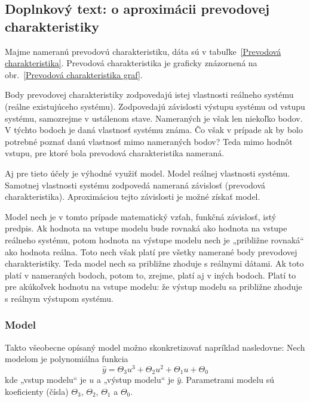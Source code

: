 \documentclass[a4paper, 10pt, ]{article}
\begin{document}

\subsection{Doplnkový text: o aproximácii prevodovej charakteristiky}

Majme nameranú prevodovú charakteristiku, dáta sú v tabuľke~\ref{Prevodová charakteristika}. Prevodová charakteristika je graficky znázornená na obr.~\ref{Prevodová charakteristika graf}.

Body prevodovej charakteristiky zodpovedajú istej vlastnosti reálneho systému (reálne existujúceho systému). Zodpovedajú závislosti výstupu systému od vstupu systému, samozrejme v ustálenom stave. Nameraných je však len niekoľko bodov. V týchto bodoch je daná vlastnosť systému známa. Čo však v prípade ak by bolo potrebné poznať danú vlastnosť mimo nameraných bodov? Teda mimo hodnôt vstupu, pre ktoré bola prevodová charakteristika nameraná.

Aj pre tieto účely je výhodné využiť model. Model reálnej vlastnosti systému. Samotnej vlastnosti systému zodpovedá nameraná závislosť (prevodová charakteristika). Aproximáciou tejto závislosti je možné získať model.

Model nech je v tomto prípade matematický vzťah, funkčná závislosť, istý predpis. Ak hodnota na vstupe modelu bude rovnaká ako hodnota na vstupe reálneho systému, potom hodnota na výstupe modelu nech je „približne rovnaká“ ako hodnota reálna. Toto nech však platí pre všetky namerané body prevodovej charakteristiky. Teda model nech sa približne zhoduje s reálnymi dátami. Ak toto platí v nameraných bodoch, potom to, zrejme, platí aj v iných bodoch. Platí to pre akúkoľvek hodnotu na vstupe modelu: že výstup modelu sa približne zhoduje s reálnym výstupom systému.


\subsubsection{Model}

Takto všeobecne opísaný model možno skonkretizovať napríklad nasledovne: Nech modelom je polynomiálna funkcia
\begin{equation} \label{polyFcnDef}
    \hat y = \Theta_3 u^3 + \Theta_2 u^2 + \Theta_1 u + \Theta_0
\end{equation}
kde „vstup modelu“ je $u$ a „výstup modelu“ je $\hat y$. Parametrami modelu sú koeficienty (čísla) $\Theta_3$, $\Theta_2$, $\Theta_1$ a $\Theta_0$.
\end{document}
